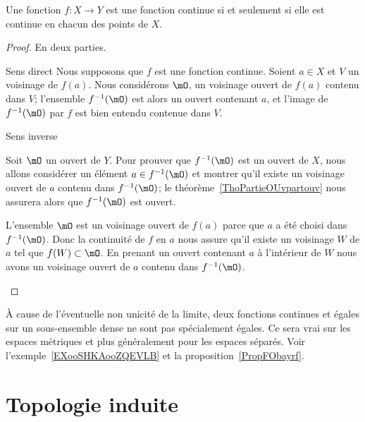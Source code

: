 \begin{theorem} \label{ThoESCaraB}
    Une fonction \( f\colon X\to Y\) est une fonction continue si et seulement si elle est continue en chacun des points de \( X\).
\end{theorem}

\begin{proof}
    En deux parties.
    \begin{subproof}
    \item[Sens direct]
        Nous supposons que \( f\) est une fonction continue. Soient \( a\in X\) et \( V\) un voisinage de \( f(a)\). Nous considérons \( \mO\), un voisinage ouvert de \( f(a)\) contenu dans \( V\); l'ensemble \( f^{-1}(\mO)\) est alors un ouvert contenant \( a\), et l'image de \( f^{-1}(\mO)\) par \( f\) est bien entendu contenue dans \( V\).

    \item[Sens inverse]

        Soit \( \mO\) un ouvert de \( Y\). Pour prouver que \( f^{-1}(\mO)\) est un ouvert de \( X\), nous allons considérer un élément \( a\in f^{-1}(\mO)\) et montrer qu'il existe un voisinage ouvert de \( a\) contenu dans \( f^{-1}(\mO)\); le théorème~\ref{ThoPartieOUvpartouv} nous assurera alors que \( f^{-1}(\mO)\) est ouvert.

        L'ensemble \( \mO\) est un voisinage ouvert de \( f(a)\) parce que \( a\) a été choisi dans \( f^{-1}(\mO)\). Donc la continuité de \( f\) en \( a\) nous assure qu'il existe un voisinage \( W\) de \( a\) tel que \( f(W)\subset\mO\). En prenant un ouvert contenant \( a\) à l'intérieur de \( W\) nous avons un voisinage ouvert de \( a\) contenu dans \( f^{-1}(\mO)\).
    \end{subproof}
\end{proof}

\begin{remark}
    À cause de l'éventuelle non unicité de la limite, deux fonctions continues et égales sur un sous-ensemble dense ne sont pas spécialement égales. Ce sera vrai sur les espaces métriques et plus généralement pour les espaces séparés. Voir l'exemple~\ref{EXooSHKAooZQEVLB} et la proposition~\ref{PropFObayrf}.
\end{remark}

\section{Topologie induite}

